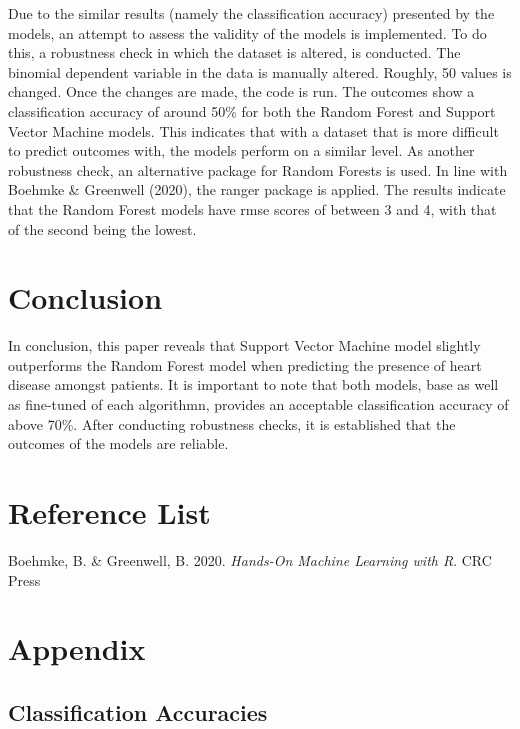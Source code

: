 \documentclass[11pt,preprint, authoryear]{elsarticle}
\numberwithin{equation}{section}
\numberwithin{figure}{section}
\numberwithin{table}{section}
\begin{document}
Due to the similar results (namely the classification accuracy)
presented by the models, an attempt to assess the validity of the models
is implemented. To do this, a robustness check in which the dataset is
altered, is conducted. The binomial dependent variable in the data is
manually altered. Roughly, 50 values is changed. Once the changes are
made, the code is run. The outcomes show a classification accuracy of
around 50\% for both the Random Forest and Support Vector Machine
models. This indicates that with a dataset that is more difficult to
predict outcomes with, the models perform on a similar level. As another
robustness check, an alternative package for Random Forests is used. In
line with Boehmke \& Greenwell (2020), the ranger package is applied.
The results indicate that the Random Forest models have rmse scores of
between 3 and 4, with that of the second being the lowest.

\hypertarget{conclusion}{%
\section{Conclusion}\label{conclusion}}

In conclusion, this paper reveals that Support Vector Machine model
slightly outperforms the Random Forest model when predicting the
presence of heart disease amongst patients. It is important to note that
both models, base as well as fine-tuned of each algorithmn, provides an
acceptable classification accuracy of above 70\%. After conducting
robustness checks, it is established that the outcomes of the models are
reliable.

\newpage

\hypertarget{reference-list}{%
\section{Reference List}\label{reference-list}}

Boehmke, B. \& Greenwell, B. 2020. \emph{Hands-On Machine Learning with
R}. CRC Press

\newpage

\hypertarget{appendix}{%
\section{Appendix}\label{appendix}}

\hypertarget{classification-accuracies}{%
\subsection{Classification Accuracies}\label{classification-accuracies}}
\end{document}
